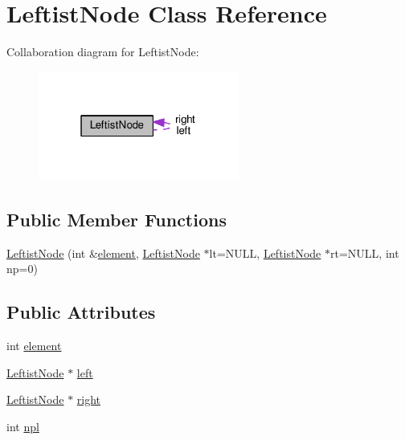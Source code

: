 \hypertarget{classLeftistNode}{}\section{Leftist\+Node Class Reference}
\label{classLeftistNode}


Collaboration diagram for Leftist\+Node\+:
\nopagebreak
\begin{figure}[H]
\begin{center}
\leavevmode
\includegraphics[width=187pt]{classLeftistNode__coll__graph}
\end{center}
\end{figure}
\subsection*{Public Member Functions}
\begin{DoxyCompactItemize}
\item 
\hyperlink{classLeftistNode_a9004469a6ac77c56b47a8a167f17c42f}{Leftist\+Node} (int \&\hyperlink{classLeftistNode_a39afeded6425dbd13bbfd1d9fffb8a95}{element}, \hyperlink{classLeftistNode}{Leftist\+Node} $\ast$lt=N\+U\+LL, \hyperlink{classLeftistNode}{Leftist\+Node} $\ast$rt=N\+U\+LL, int np=0)
\end{DoxyCompactItemize}
\subsection*{Public Attributes}
\begin{DoxyCompactItemize}
\item 
int \hyperlink{classLeftistNode_a39afeded6425dbd13bbfd1d9fffb8a95}{element}
\item 
\hyperlink{classLeftistNode}{Leftist\+Node} $\ast$ \hyperlink{classLeftistNode_a62469c988fc0537dd6682d56f2108d99}{left}
\item 
\hyperlink{classLeftistNode}{Leftist\+Node} $\ast$ \hyperlink{classLeftistNode_aee2ba46112890733b87007103122fc2a}{right}
\item 
int \hyperlink{classLeftistNode_afcd068d744065dc1201d1f738b923447}{npl}
\end{DoxyCompactItemize}


